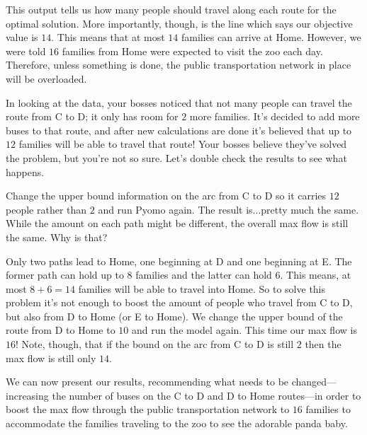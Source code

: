 \documentclass{article}
\begin{document}
This output tells us how many people should travel along each route for the optimal solution.  More importantly, though, is the line which says our objective value is $14$.  This means that at most $14$ families can arrive at Home.  However, we were told $16$ families from Home were expected to visit the zoo each day.  Therefore, unless something is done, the public transportation network in place will be overloaded.

In looking at the data, your bosses noticed that not many people can travel the route from C to D; it only has room for $2$ more families.  It's decided to add more buses to that route, and after new calculations are done it's believed that up to $12$ families will be able to travel that route!  Your bosses believe they've solved the problem, but you're not so sure.  Let's double check the results to see what happens.

Change the upper bound information on the arc from C to D so it carries $12$ people rather than $2$ and run Pyomo again.  The result is...pretty much the same.  While the amount on each path might be different, the overall max flow is still the same.  Why is that?

Only two paths lead to Home, one beginning at D and one beginning at E.  The former path can hold up to $8$ families and the latter can hold $6$.  This means, at most $8+6=14$ families will be able to travel into Home.  So to solve this problem it's not enough to boost the amount of people who travel from C to D, but also from D to Home (or E to Home).  We change the upper bound of the route from D to Home to $10$ and run the model again.  This time our max flow is $16$!  Note, though, that if the bound on the arc from C to D is still $2$ then the max flow is still only $14$.  

We can now present our results, recommending what needs to be changed---increasing the number of buses on the C to D and D to Home routes---in order to boost the max flow through the public transportation network to $16$ families to accommodate the families traveling to the zoo to see the adorable panda baby.
\end{document}
